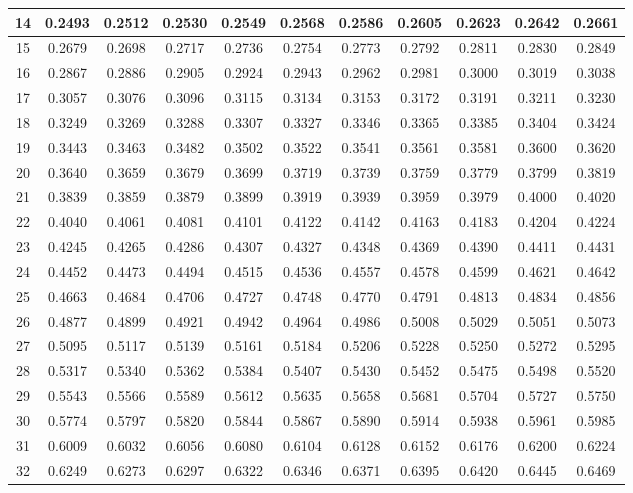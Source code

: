 {\begin{tabular}{|c|cccccccccc|}
14 & 0.2493 & 0.2512 & 0.2530 & 0.2549 & 0.2568 & 0.2586 & 0.2605 & 0.2623 & 0.2642 & 0.2661 \\
\hline
15 & 0.2679 & 0.2698 & 0.2717 & 0.2736 & 0.2754 & 0.2773 & 0.2792 & 0.2811 & 0.2830 & 0.2849 \\
16 & 0.2867 & 0.2886 & 0.2905 & 0.2924 & 0.2943 & 0.2962 & 0.2981 & 0.3000 & 0.3019 & 0.3038 \\
17 & 0.3057 & 0.3076 & 0.3096 & 0.3115 & 0.3134 & 0.3153 & 0.3172 & 0.3191 & 0.3211 & 0.3230 \\
18 & 0.3249 & 0.3269 & 0.3288 & 0.3307 & 0.3327 & 0.3346 & 0.3365 & 0.3385 & 0.3404 & 0.3424 \\
19 & 0.3443 & 0.3463 & 0.3482 & 0.3502 & 0.3522 & 0.3541 & 0.3561 & 0.3581 & 0.3600 & 0.3620 \\
\hline
20 & 0.3640 & 0.3659 & 0.3679 & 0.3699 & 0.3719 & 0.3739 & 0.3759 & 0.3779 & 0.3799 & 0.3819 \\
21 & 0.3839 & 0.3859 & 0.3879 & 0.3899 & 0.3919 & 0.3939 & 0.3959 & 0.3979 & 0.4000 & 0.4020 \\
22 & 0.4040 & 0.4061 & 0.4081 & 0.4101 & 0.4122 & 0.4142 & 0.4163 & 0.4183 & 0.4204 & 0.4224 \\
23 & 0.4245 & 0.4265 & 0.4286 & 0.4307 & 0.4327 & 0.4348 & 0.4369 & 0.4390 & 0.4411 & 0.4431 \\
24 & 0.4452 & 0.4473 & 0.4494 & 0.4515 & 0.4536 & 0.4557 & 0.4578 & 0.4599 & 0.4621 & 0.4642 \\
\hline
25 & 0.4663 & 0.4684 & 0.4706 & 0.4727 & 0.4748 & 0.4770 & 0.4791 & 0.4813 & 0.4834 & 0.4856 \\
26 & 0.4877 & 0.4899 & 0.4921 & 0.4942 & 0.4964 & 0.4986 & 0.5008 & 0.5029 & 0.5051 & 0.5073 \\
27 & 0.5095 & 0.5117 & 0.5139 & 0.5161 & 0.5184 & 0.5206 & 0.5228 & 0.5250 & 0.5272 & 0.5295 \\
28 & 0.5317 & 0.5340 & 0.5362 & 0.5384 & 0.5407 & 0.5430 & 0.5452 & 0.5475 & 0.5498 & 0.5520 \\
29 & 0.5543 & 0.5566 & 0.5589 & 0.5612 & 0.5635 & 0.5658 & 0.5681 & 0.5704 & 0.5727 & 0.5750 \\
\hline
30 & 0.5774 & 0.5797 & 0.5820 & 0.5844 & 0.5867 & 0.5890 & 0.5914 & 0.5938 & 0.5961 & 0.5985 \\
31 & 0.6009 & 0.6032 & 0.6056 & 0.6080 & 0.6104 & 0.6128 & 0.6152 & 0.6176 & 0.6200 & 0.6224 \\
32 & 0.6249 & 0.6273 & 0.6297 & 0.6322 & 0.6346 & 0.6371 & 0.6395 & 0.6420 & 0.6445 & 0.6469 \\

\end{tabular}}
